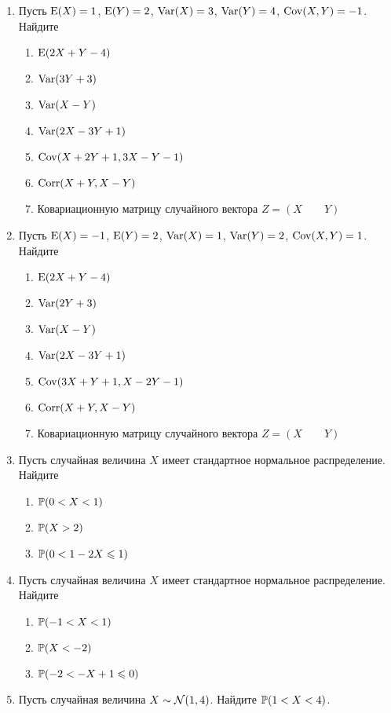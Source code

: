 \begin{enumerate}
\item Пусть $\E(X)=1$, $\E(Y)=2$, $\Var(X) = 3$, $\Var(Y) = 4$, $\Cov(X,Y) = -1$. Найдите
\begin{enumerate}
\item $\E(2X + Y - 4)$
\item $\Var(3Y + 3)$
\item $\Var(X - Y)$
\item $\Var(2X - 3Y +1)$
\item $\Cov(X+ 2Y + 1,3X - Y -1)$
\item $\Corr(X + Y, X - Y)$
\item Ковариационную матрицу случайного вектора $Z = (X \qquad Y)$
\end{enumerate}


\item Пусть $\E(X)=-1$, $\E(Y)=2$, $\Var(X) = 1$, $\Var(Y) = 2$, $\Cov(X,Y) = 1$. Найдите
\begin{enumerate}
\item $\E(2X + Y - 4)$
\item $\Var(2Y + 3)$
\item $\Var(X - Y)$
\item $\Var(2X - 3Y +1)$
\item $\Cov(3X+ Y + 1,X - 2Y -1)$
\item $\Corr(X + Y, X - Y)$
\item Ковариационную матрицу случайного вектора $Z = (X \qquad Y)$
\end{enumerate}

\item Пусть случайная величина $X$ имеет стандартное нормальное распределение.
Найдите
\begin{enumerate}
\item $\P(0 < X < 1)$
\item $\P(X > 2)$
\item $\P(0 < 1 - 2X \leq 1)$
\end{enumerate}

\item Пусть случайная величина $X$ имеет стандартное нормальное распределение.
Найдите
\begin{enumerate}
\item $\P(-1 < X < 1)$
\item $\P(X < -2)$
\item $\P(-2 < -X + 1 \leq 0)$
\end{enumerate}

\item Пусть случайная величина $X \sim \cN(1,4)$. Найдите $\P(1<X<4)$.


\end{enumerate}
